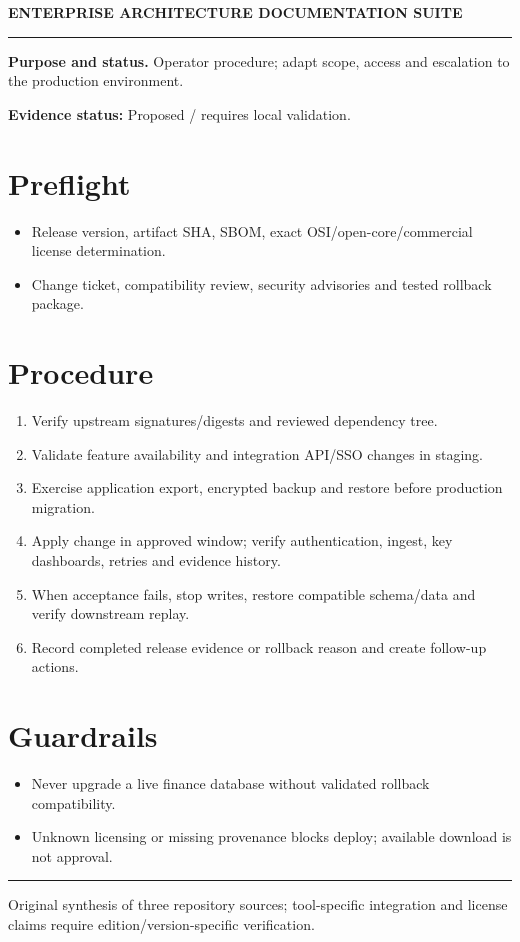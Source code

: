 \documentclass[10pt,letterpaper]{article}
\begin{document}
\begin{center}
{\large\bfseries\color{teal} ENTERPRISE ARCHITECTURE DOCUMENTATION SUITE}\par
{}\par
{}\par
\end{center}
\vspace{8pt}\hrule\vspace{12pt}
\textbf{Purpose and status.} Operator procedure; adapt scope, access and escalation to the production environment.\par
\textbf{Evidence status:} Proposed / requires local validation.\par
\section{Preflight}
\begin{itemize}
\item Release version, artifact SHA, SBOM, exact OSI/open-core/commercial license determination.
\item Change ticket, compatibility review, security advisories and tested rollback package.
\end{itemize}
\section{Procedure}
\begin{enumerate}
\item Verify upstream signatures/digests and reviewed dependency tree.
\item Validate feature availability and integration API/SSO changes in staging.
\item Exercise application export, encrypted backup and restore before production migration.
\item Apply change in approved window; verify authentication, ingest, key dashboards, retries and evidence history.
\item When acceptance fails, stop writes, restore compatible schema/data and verify downstream replay.
\item Record completed release evidence or rollback reason and create follow-up actions.
\end{enumerate}
\section{Guardrails}
\begin{itemize}
\item Never upgrade a live finance database without validated rollback compatibility.
\item Unknown licensing or missing provenance blocks deploy; available download is not approval.
\end{itemize}
\vfill\noindent\color{muted}\rule{\linewidth}{0.4pt}\par\scriptsize Original synthesis of three repository sources; tool-specific integration and license claims require edition/version-specific verification.\normalsize
\end{document}
